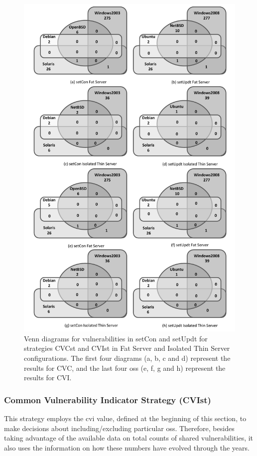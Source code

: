 \begin{figure}[!ht]
 \centering
 \includegraphics[scale=0.7]{images/images/grayscale_ven_dia_one_fig_update.pdf}
 \caption{Venn diagrams for vulnerabilities in setCon and setUpdt for strategies CVCst and CVIst in Fat Server and Isolated Thin Server configurations. The first four diagrams (a, b, c and d) represent the results for CVC, and the last four \glspl{os} (e, f, g and h) represent the results for CVI.}
 \label{fig-venn}
\end{figure}


\subsubsection*{Common Vulnerability Indicator Strategy (CVIst)} 
This strategy employs the \gls{cvi} value, defined at the beginning of this section, to make decisions about including/excluding particular \glspl{os}.
Therefore, besides taking advantage of the available data on total counts of shared vulnerabilities, it also uses the information on how these numbers have evolved through the years.

